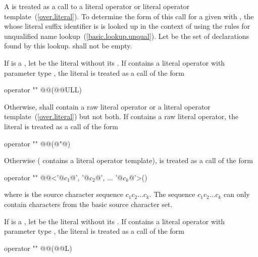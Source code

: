 \pnum
A  is treated as a call to a literal operator or
literal operator template~(\ref{over.literal}). To determine the form of this call for a
given   with  ,
the  whose literal suffix identifier is  is
looked up in the context of  using the rules for unqualified name
lookup~(\ref{basic.lookup.unqual}). Let  be the set of declarations found by
this lookup.  shall not be empty.

\pnum
If  is a , let  be the literal
without its . If  contains a literal operator with
parameter type , the literal  is treated as a call of
the form

\begin{codeblock}
operator "" @@(@@ULL)
\end{codeblock}

Otherwise,  shall contain a raw literal operator or a literal operator
template~(\ref{over.literal}) but not both. If  contains a raw literal operator,
the literal  is treated as a call of the form

\begin{codeblock}
operator "" @@(@"@)
\end{codeblock}

Otherwise ( contains a literal operator template),  is treated as a call
of the form


\begin{codeblock}
operator "" @@<'@$c_1$@', '@$c_2$@', ... '@$c_k$@'>()
\end{codeblock}

where  is the source character sequence $c_1c_2...c_k$. \enternote The sequence
$c_1c_2...c_k$ can only contain characters from the basic source character set.
\exitnote

\pnum
If  is a , let  be the
literal without its . If  contains a literal operator
with parameter type , the literal  is treated as a call of
the form

\begin{codeblock}
operator "" @@(@@L)
\end{codeblock}

